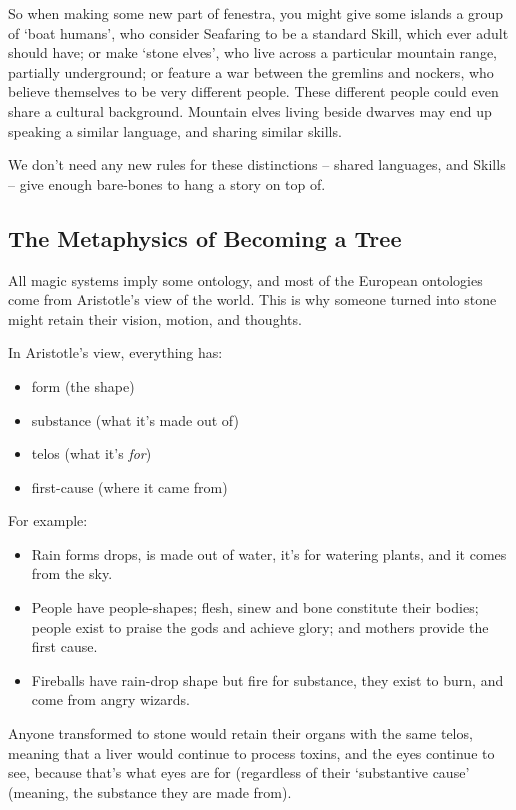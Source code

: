 \begin{multicols}{2}
So when making some new part of \gls{fenestra}, you might give some islands a group of `boat humans', who consider Seafaring to be a standard Skill, which ever adult should have; or make `stone elves', who live across a particular mountain range, partially underground; or feature a war between the gremlins and nockers, who believe themselves to be very different people.
These different people could even share a cultural background.
Mountain elves living beside dwarves may end up speaking a similar language, and sharing similar skills.

We don't need any new rules for these distinctions -- shared languages, and Skills -- give enough bare-bones to hang a story on top of.

\subsection{The Metaphysics of Becoming a Tree}

All magic systems imply some ontology, and most of the European ontologies come from Aristotle's view of the world.
This is why someone turned into stone might retain their vision, motion, and thoughts.

In Aristotle's view, everything has:

\begin{itemize}
  \item
  form (the shape)
  \item
  substance (what it's made out of)
  \item
  telos (what it's \emph{for})
  \item
  first-cause (where it came from)
\end{itemize}

\noindent
For example:

\begin{itemize}
  \item
  Rain forms drops, is made out of water, it's for watering plants, and it comes from the sky.
  \item
  People have people-shapes; flesh, sinew and bone constitute their bodies; people exist to praise the gods and achieve glory; and mothers provide the first cause.
  \item
  Fireballs have rain-drop shape but fire for substance, they exist to burn, and come from angry wizards.
\end{itemize}

Anyone transformed to stone would retain their organs with the same telos, meaning that a liver would continue to process toxins, and the eyes continue to see, because that's what eyes are for (regardless of their `substantive cause' (meaning, the substance they are made from).


\end{multicols}
